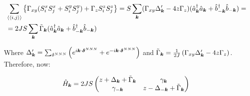 \begin{align*}
&\sum_{\langle \langle i,j \rangle \rangle} \left\{ \Gamma_{xy}(S_i^xS_j^x + S_i^yS_j^y) + \Gamma_zS_i^zS_j^z\right\}
= S\sum_{\boldsymbol{k}} (\Gamma_{xy}\Delta'_{\boldsymbol{k}}-4z\Gamma_z) (\hat{a}^\dagger_{\boldsymbol{k}}\hat{a}_{\boldsymbol{k}}+\hat{b}^\dagger_{-\boldsymbol{k}}\hat{b}_{-\boldsymbol{k}}) = \\
&=2JS\sum_{\boldsymbol{k}} \tilde{\Gamma}_{\boldsymbol{k}}(\hat{a}^\dagger_{\boldsymbol{k}}\hat{a}_{\boldsymbol{k}}+\hat{b}^\dagger_{-\boldsymbol{k}}\hat{b}_{-\boldsymbol{k}})
\end{align*}

Where $\Delta'_{\boldsymbol{k}} = \sum_{\delta^{NNN}} \left( e^{i\boldsymbol{k}\cdot \boldsymbol{\delta}^{NNN}} +  e^{-i\boldsymbol{k}\cdot \boldsymbol{\delta}^{NNN}}\right)$ and $\tilde{\Gamma}_{\boldsymbol{k}} = \frac{1}{2J}\left( \Gamma_{xy}\Delta'_{\boldsymbol{k}}-4z\Gamma_z \right)$. Therefore, now:

\begin{equation}
\hat{H}_{\boldsymbol{k}} = 2JS\begin{pmatrix} 
z + \Delta_{\boldsymbol{k}} + \tilde{\Gamma}_{\boldsymbol{k}} & \gamma_{\boldsymbol{k}} \\
\gamma_{-\boldsymbol{k}} & z - \Delta_{-\boldsymbol{k}} + \tilde{\Gamma}_{\boldsymbol{k}}
\end{pmatrix}
\end{equation}

